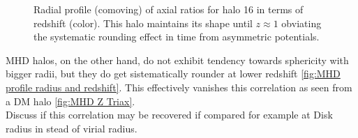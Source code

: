 \documentclass[a4paper,fleqn,usenatbib]{mnras}
\begin{document}
\begin{figure}
  \centering
  \hfill
  \caption{Radial profile (comoving) of axial ratios for halo 16 in terms of redshift (color). This halo maintains its shape until $z\approx 1$ obviating the systematic rounding effect in time from asymmetric potentials. }
  \label{fig:RedshiftGood}
\end{figure}

MHD halos, on the other hand, do not exhibit tendency towards sphericity with bigger radii, but they do get sistematically rounder at lower redshift \ref{fig:MHD profile radius and redshift}. This effectively vanishes this correlation as seen from a DM halo \ref{fig:MHD Z Triax}.\\

Discuss if this correlation may be recovered if compared for example at Disk radius in stead of virial radius.\\
\end{document}
